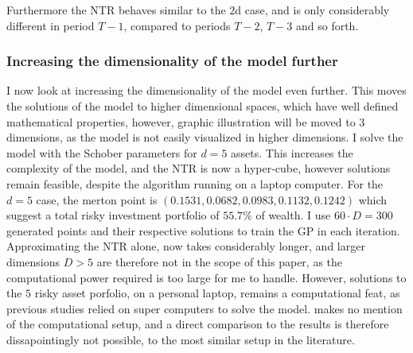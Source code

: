 \documentclass[11pt]{article}
\begin{document}
Furthermore the \ac{NTR} behaves similar to the $2$d case, and is only considerably different in period $T-1$,
compared to periods $T-2$, $T-3$ and so forth.

\subsubsection{Increasing the dimensionality of the model further} \label{Subsubsection: IncreasingDimensionalityFurther}
I now look at increasing the dimensionality of the model even further.
This moves the solutions of the model to higher dimensional spaces, which have well defined mathematical properties, however,
graphic illustration will be moved to $3$ dimensions, as the model is not easily visualized in higher dimensions.
I solve the model with the Schober parameters for $d = 5$ assets. This increases the complexity of the model, and the \ac{NTR} is now a hyper-cube,
however solutions remain feasible, despite the algorithm running on a laptop computer.
For the $d = 5$ case, the merton point is $(0.1531, 0.0682, 0.0983, 0.1132, 0.1242)$ which suggest a total risky investment portfolio of $55.7\%$ of wealth.
I use $60\cdot D = 300$ generated points and their respective solutions to train the \ac{GP} in each iteration.
Approximating the \ac{NTR} alone, now takes considerably longer, and larger dimensions $D>5$ are therefore not in the scope of this paper, as the computational power required
is too large for me to handle.
However, solutions to the $5$ risky asset porfolio, on a personal laptop, remains a computational feat, as previous studies \autocites{CaiJuddXu2013}{Schober2022} relied on super computers to solve the model.
\autocite{Scheidegger2023} makes no mention of the computational setup, and a direct comparison to the results is therefore dissapointingly not possible, 
to the most similar setup in the literature.
\end{document}
